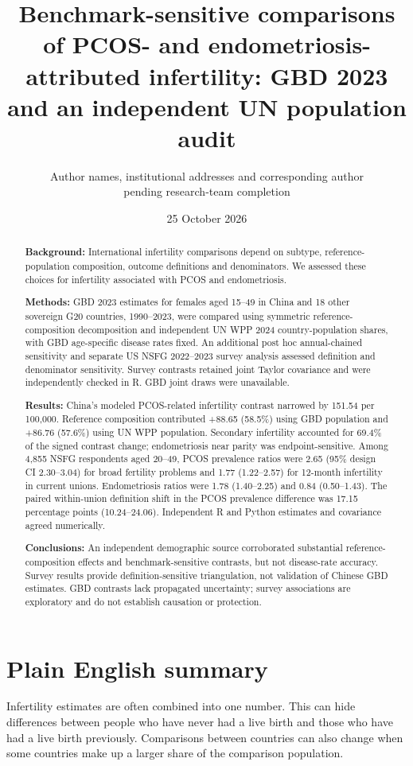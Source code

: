 \documentclass[11pt,a4paper]{article}
\title{Benchmark-sensitive comparisons of PCOS- and endometriosis-attributed infertility: GBD 2023 and an independent UN population audit}
\author{\parbox{0.9\textwidth}{\centering Author names, institutional addresses and corresponding author\\pending research-team completion}}
\date{25 October 2026}
\begin{document}
\maketitle
\linenumbers
\begin{abstract}
\noindent\textbf{Background:} International infertility comparisons depend on subtype, reference-population composition, outcome definitions and denominators. We assessed these choices for infertility associated with PCOS and endometriosis.

\noindent\textbf{Methods:} GBD 2023 estimates for females aged 15--49 in China and 18 other sovereign G20 countries, 1990--2023, were compared using symmetric reference-composition decomposition and independent UN WPP 2024 country-population shares, with GBD age-specific disease rates fixed. An additional post hoc annual-chained sensitivity and separate US NSFG 2022--2023 survey analysis assessed definition and denominator sensitivity. Survey contrasts retained joint Taylor covariance and were independently checked in R. GBD joint draws were unavailable.

\noindent\textbf{Results:} China's modeled PCOS-related infertility contrast narrowed by 151.54 per 100,000. Reference composition contributed +88.65 (58.5\%) using GBD population and +86.76 (57.6\%) using UN WPP population. Secondary infertility accounted for 69.4\% of the signed contrast change; endometriosis near parity was endpoint-sensitive. Among 4,855 NSFG respondents aged 20--49, PCOS prevalence ratios were 2.65 (95\% design CI 2.30--3.04) for broad fertility problems and 1.77 (1.22--2.57) for 12-month infertility in current unions. Endometriosis ratios were 1.78 (1.40--2.25) and 0.84 (0.50--1.43). The paired within-union definition shift in the PCOS prevalence difference was 17.15 percentage points (10.24--24.06). Independent R and Python estimates and covariance agreed numerically.

\noindent\textbf{Conclusions:} An independent demographic source corroborated substantial reference-composition effects and benchmark-sensitive contrasts, but not disease-rate accuracy. Survey results provide definition-sensitive triangulation, not validation of Chinese GBD estimates. GBD contrasts lack propagated uncertainty; survey associations are exploratory and do not establish causation or protection.
\end{abstract}

\section*{Plain English summary}
Infertility estimates are often combined into one number. This can hide differences between people who have never had a live birth and those who have had a live birth previously. Comparisons between countries can also change when some countries make up a larger share of the comparison population.
\end{document}
